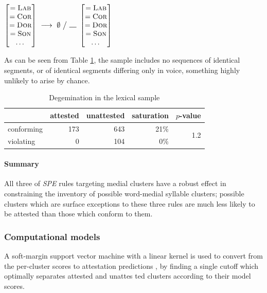 \begin{example}
$\begin{bmatrix} =\textsc{Lab} \\ =\textsc{Cor} \\ =\textsc{Dor} \\ =\textsc{Son} \\ \ldots{} \end{bmatrix}~\goesto~\emptyset~\big /~\gap~\begin{bmatrix} =\textsc{Lab} \\ =\textsc{Cor} \\ =\textsc{Dor} \\ =\textsc{Son} \\ \ldots{} \end{bmatrix}$
\end{example}

\noindent
As can be seen from Table \ref{degemtab}, the sample includes no sequences of identical segments, or of identical segments differing only in voice, something highly unlikely to arise by chance.

\begin{table}
\centering
\begin{tabular}{l rrrr}
\toprule
           & attested & unattested & saturation & $p$-value \\
\midrule
conforming & 173      & 643        & 21\%       & \multirow{2}{*}{1.2\e{-10}} \\
violating  & 0        & 104        & 0\%        \\
\bottomrule
\end{tabular}
\caption{Degemination in the lexical sample}
\label{degemtab}
\end{table}

\paragraph{Summary} All three of \emph{SPE} rules targeting medial clusters have a robust effect in constraining the inventory of possible word-medial syllable clusters; possible clusters which are surface exceptions to these three rules are much less likely to be attested than those which conform to them. 

\subsubsection{Computational models}

A soft-margin support vector machine \citep{Cortes1995} with a linear kernel is used to convert from the per-cluster scores to attestation predictions
, by finding a single cutoff which optimally separates attested and unattes
ted clusters according to their model scores. 

